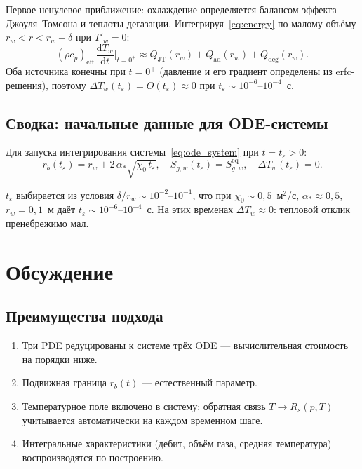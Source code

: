\documentclass[12pt,a4paper]{article}
\newcommand{\dd}{\mathrm{d}}
\newcommand{\eff}{\mathrm{eff}}
\begin{document}
Первое ненулевое приближение: охлаждение определяется
балансом эффекта Джоуля--Томсона и теплоты дегазации.
Интегрируя~\eqref{eq:energy} по малому объёму
$r_w < r < r_w + \delta$ при $T'_w = 0$:
\begin{equation}\label{eq:dTw_init}
  (\rho c_p)_\eff\,\frac{\dd T_w}{\dd t}\bigg|_{t=0^+}
  \approx Q_\mathrm{JT}(r_w) + Q_\mathrm{ad}(r_w) + Q_\mathrm{deg}(r_w).
\end{equation}
Оба источника конечны при $t = 0^+$ (давление и его
градиент определены из erfc-решения), поэтому
$\Delta T_w(t_\varepsilon) = O(t_\varepsilon) \approx 0$
при $t_\varepsilon \sim 10^{-6}\text{--}10^{-4}$~с.

\subsection{Сводка: начальные данные для ODE-системы}

Для запуска интегрирования системы~\eqref{eq:ode_system}
при $t = t_\varepsilon > 0$:
\begin{equation}\label{eq:ic_regularized}
  \boxed{
    r_b(t_\varepsilon) = r_w + 2\,\alpha_*\sqrt{\chi_0\,t_\varepsilon},
    \quad
    S_{g,w}(t_\varepsilon) = S_{g,w}^{\mathrm{eq}},
    \quad
    \Delta T_w(t_\varepsilon) = 0.
  }
\end{equation}

$t_\varepsilon$ выбирается из условия $\delta/r_w \sim 10^{-2}\text{--}10^{-1}$,
что при $\chi_0 \sim 0{,}5$~м$^2$/с, $\alpha_* \approx 0{,}5$,
$r_w = 0{,}1$~м даёт $t_\varepsilon \sim 10^{-6}\text{--}10^{-4}$~с.
На этих временах $\Delta T_w \approx 0$: тепловой отклик пренебрежимо мал.


\section{Обсуждение}\label{sec:discussion}

\subsection{Преимущества подхода}

\begin{enumerate}[nosep]
  \item Три PDE редуцированы к системе трёх ODE ---
        вычислительная стоимость на порядки ниже.
  \item Подвижная граница $r_b(t)$ --- естественный параметр.
  \item Температурное поле включено в систему: обратная связь
        $T \to R_s(p,T)$ учитывается автоматически на каждом
        временном шаге.
  \item Интегральные характеристики (дебит, объём газа,
        средняя температура) воспроизводятся по построению.
\end{enumerate}
\end{document}

